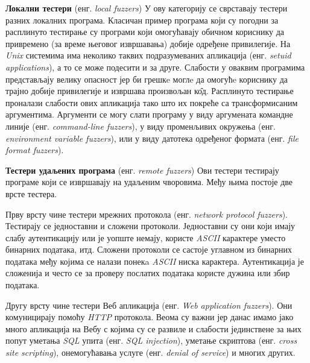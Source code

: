 \documentclass[12pt,oneside]{memoir}
\begin{document}
\begin{description}
\item \textbf{Локални тестери} (енг. \textit{local fuzzers}) У ову категорију се сврставају тестери разних локалних програма. Класичан пример програма који су погодни за расплинуто тестирање су програми који омогућавају обичном кориснику да привремено (за време његовог извршавања) добије одређене привилегије. На \textit{Unix} системима има неколико таквих подразумеваних апликација (енг. \textit{setuid applications}), а то се може подесити и за друге. Слабости у оваквим програмима представљају велику опасност јер би грешкe моглe да омогућe кориснику да трајно добије привилегије и извршава произвољан к\^{о}д. Расплинуто тестирање проналази слабости ових апликација тако што их покреће са трансформисаним аргументима. Аргументи се могу слати програму у виду аргумената командне линије (енг. \textit{command-line fuzzers}), у виду променљивих окружења (енг. \textit{environment variable fuzzers}), или у виду датотека одређеног формата (енг. \textit{file format fuzzers}).
\item \textbf{Тестери удаљених програма} (енг. \textit{remote fuzzers}) Ови тестери тестирају програме који се извршавају на удаљеним чворовима. Међу њима постоје две врсте тестера. 

Прву врсту чине тестери мрежних протокола (енг. \textit{network protocol fuzzers}). Тестирају се једноставни и сложени протоколи. Једноставни су они који имају слабу аутентикацију или је уопште немају, користе \textit{ASCII} карактере уместо бинарних података, итд. Сложени протоколи се састоје углавном из бинарних података међу којима се налази понекa \textit{ASCII} ниска карактера. Аутентикација је сложенија и често се за проверу послатих података користе дужина или збир података.  

Другу врсту чине тестери Веб апликација (енг. \textit{Web application fuzzers}). Они комуницирају помоћу \textit{HTTP} протокола. Веома су важни јер данас имамо јако много апликација на Вебу с којима су се развиле и слабости јединствене за њих попут уметања \textit{SQL} упита (енг. \textit{SQL injection}), уметање скриптова (енг. \textit{cross site scripting}), онемогућавања услуге (енг. \textit{denial of service}) и многих других.


\end{description}
\end{document}
